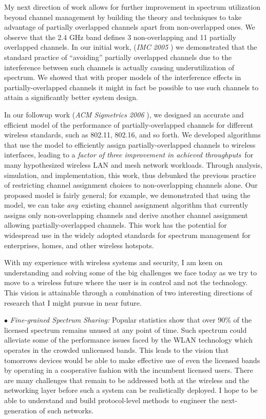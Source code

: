 \documentclass[10pt,letterpaper]{article}
\begin{document}
 My next direction of work allows for further
improvement in spectrum utilization beyond channel management by building the theory and techniques to take advantage of
partially overlapped channels apart from non-overlapped ones.  We observe that the 2.4 GHz band defines 3
non-overlapping and 11 partially overlapped channels. In our initial work, ({\it IMC 2005 }) we demonstrated that the
standard practice of ``avoiding'' partially overlapped channels due to the interference between such channels is
actually causing underutilization of spectrum.  We showed that with proper models of the interference effects in
partially-overlapped channels it might in fact be possible to use such channels to attain a significantly better system
design.

In our followup work ({\it ACM Sigmetrics 2006 }), we designed an accurate and efficient model of the performance of
partially-overlapped channels for different wireless standards, such as 802.11, 802.16, and so forth. We developed
algorithms that use the model to efficiently assign partially-overlapped channels to wireless interfaces, leading to a
{\em factor of three improvement in achieved throughputs}\ for many hypothesized wireless LAN and mesh network
workloads. Through analysis, simulation, and implementation, this work, thus debunked the previous practice of
restricting channel assignment choices to non-overlapping channels alone. Our proposed model is fairly general; for
example, we demonstrated that using the model, we can take {\em any}\ existing channel assignment algorithm that
currently assigns only non-overlapping channels and derive another channel assignment allowing partially-overlapped
channels. This work has the potential for widespread use in the widely adopted standards for spectrum management for
enterprises, homes, and other wireless hotspots.


 With my experience with wireless systems and security, I am keen on 
understanding and solving some of the big challenges we face today as we try to move to a  wireless future
where the user is in control and not the technology. This vision is attainable through a combination of two interesting 
directions of research that I might pursue in near future.

$\bullet$ {\it Fine-grained Spectrum Sharing:} Popular statistics show that over 90\% of the licensed spectrum remains
unused at any point of time.  Such spectrum could alleviate some of the performance issues faced by the WLAN technology
which operates in the crowded unlicensed bands. This leads to the vision that tomorrows devices would be able to make
effective use of even the licensed bands by operating in a cooperative fashion with the incumbent licensed users. There
are many challenges that remain to be addressed both at the wireless and the networking layer before such a system can
be realistically deployed. I hope to be able to understand and build protocol-level methods to engineer the
next-generation of such networks. 
\end{document}
